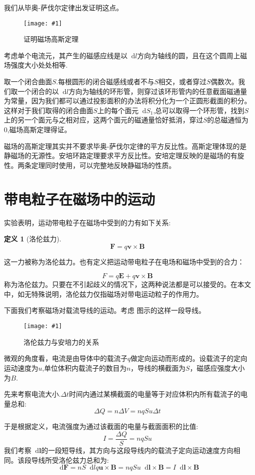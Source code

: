 \documentclass[12pt,a4paper,oneside]{report}
\theoremstyle{definition}
\newtheorem{definition}{定义}[chapter]
\theoremstyle{remark}
\newcommand{\insertfig}[3]{
    \begin{figure}[ht]
        \centering
        \texttt{[image: \#1]}
        \caption{#2}
        \label{fig:#1}
    \end{figure}
}
\renewcommand{\d}{\mathop{}\!\mathrm{d}}
\begin{document}
我们从毕奥-萨伐尔定律出发证明这点。
\insertfig{2-9.png}{证明磁场高斯定理}{0.25}

考虑单个电流元，其产生的磁感应线是以$\d l$方向为轴线的圆，且在这个圆周上磁场强度大小处处相等.

取一个闭合曲面$S$.每根圆形的闭合磁感线或者不与$S$相交，或者穿过$S$偶数次。我们取一个闭合的以$\d l$方向为轴线的环形管，则穿过该环形管内的任意截面磁通量为常量，因为我们都可以通过投影面积的办法将积分化为一个正圆形截面的积分。这样对于我们取得的闭合曲面$S$上的每个面元$\d S_1$,总可以取得一个环形管，找到$S$上的另一个面元与之相对应，这两个面元的磁通量恰好抵消，穿过$S$的总磁通恒为$0$,磁场高斯定理得证。

磁场的高斯定理其实并不要求毕奥-萨伐尔定律的平方反比性。高斯定理体现的是静磁场的无源性。安培环路定理要求平方反比性。安培定理反映的是磁场的有旋性。两条定理同时使用，可以完整地反映静磁场的性质。

\section{带电粒子在磁场中的运动}
实验表明，运动带电粒子在磁场中受到的力有如下关系:
\begin{definition}[洛伦兹力]
  \[
\mathbf{F}=q\mathbf{v}\times \mathbf{B}
\]
\end{definition}

这一力被称为洛伦兹力。也有定义把运动带电粒子在电场和磁场中受到的合力：

\[
F = q\mathbf{E}+q\mathbf{v}\times\mathbf{B}
\]
称为洛伦兹力。只要在不引起歧义的情况下，这两种说法都是可以接受的。在本文中，如无特殊说明，洛伦兹力仅指磁场对带电运动粒子的作用力。

下面我们考察磁场对载流导线的运动。考虑
图示的这样一段导线。

\insertfig{2-10.png}{洛伦兹力与安培力的关系}{0.25}

微观的角度看，电流是由导体中的载流子$q$做定向运动而形成的。设载流子的定向运动速度为$u$,单位体积内载流子的数目为$n$，导线的横截面为$S$，磁感应强度大小为$B$.

先来考察电流大小.$\Delta t$时间内通过某横截面的电量等于对应体积内所有载流子的电量总和:
\[
\Delta Q = n\Delta V =nq Su \Delta t 
\]

于是根据定义，电流强度为通过该截面的电量与截面面积的比值:
\[
I = \frac{\Delta Q}{S}=nqSu
\]
我们考察$\d \mathbf{l}$的一段短导线，其方向与这段导线内的载流子定向运动速度方向相同。该段导线所受洛伦兹力总和为:
\[
\d \mathbf{F} = nS\d l q \mathbf{u}\times \mathbf{B} = nqSu \d \mathbf{l}\times \mathbf{B} = I \d \mathbf{l}\times \mathbf{B}
\]
\end{document}
